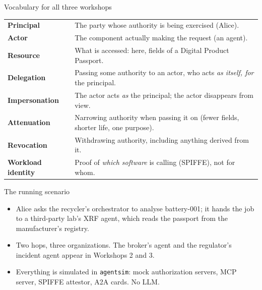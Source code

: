 \documentclass[aspectratio=169, 10pt]{beamer}
\begin{document}
\begin{frame}{Vocabulary for all three workshops}
  \small
  \begin{tabularx}{\textwidth}{@{}l X@{}}
    \toprule
    \textbf{Principal} & The party whose authority is being exercised (Alice). \\
    \textbf{Actor} & The component actually making the request (an agent). \\
    \textbf{Resource} & What is accessed: here, fields of a Digital Product Passport. \\
    \textbf{Delegation} & Passing some authority to an actor, who acts \emph{as itself, for} the principal. \\
    \textbf{Impersonation} & The actor acts \emph{as} the principal; the actor disappears from view. \\
    \textbf{Attenuation} & Narrowing authority when passing it on (fewer fields, shorter life, one purpose). \\
    \textbf{Revocation} & Withdrawing authority, including anything derived from it. \\
    \textbf{Workload identity} & Proof of \emph{which software} is calling (SPIFFE), not for whom. \\
    \bottomrule
  \end{tabularx}
\end{frame}

\begin{frame}{The running scenario}
  \centering
  
  \vspace{2mm}
  \begin{itemize}\small
    \item Alice asks the recycler's orchestrator to analyse battery-001; it hands the job to a third-party lab's XRF agent, which reads the passport from the manufacturer's registry.
    \item Two hops, three organizations. The broker's agent and the regulator's incident agent appear in Workshops 2 and 3.
    \item Everything is simulated in \texttt{agentsim}: mock authorization servers, MCP server, SPIFFE attestor, A2A cards. No LLM.
  \end{itemize}
\end{frame}
\end{document}
